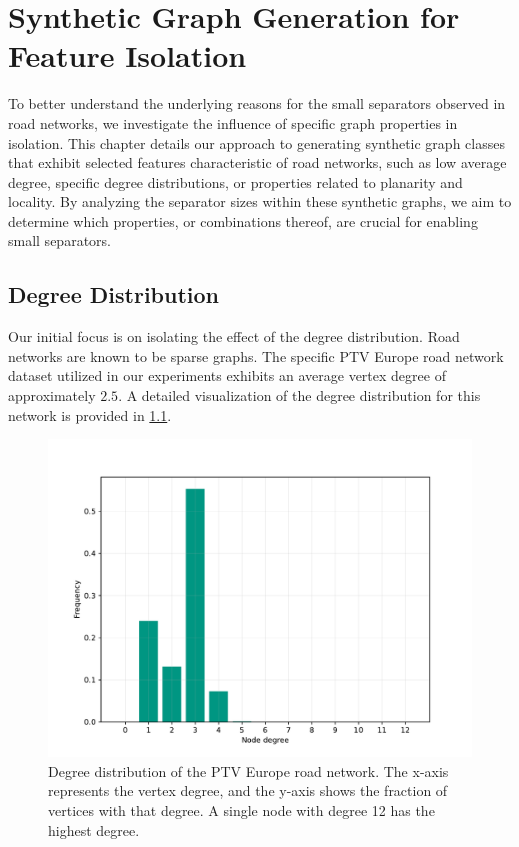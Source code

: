 \chapter{Synthetic Graph Generation for Feature Isolation}

To better understand the underlying reasons for the small separators observed in road networks, we investigate the influence of specific graph properties in isolation.
This chapter details our approach to generating synthetic graph classes that exhibit selected features characteristic of road networks, such as low average degree, specific degree distributions, or properties related to planarity and locality.
By analyzing the separator sizes within these synthetic graphs, we aim to determine which properties, or combinations thereof, are crucial for enabling small separators.

\section{Degree Distribution}

Our initial focus is on isolating the effect of the degree distribution.
Road networks are known to be sparse graphs.
The specific PTV Europe road network dataset \cite{ptv_group_dimacs-europe_2009} utilized in our experiments exhibits an average vertex degree of approximately \(2.5\).
A detailed visualization of the degree distribution for this network is provided in \cref{fig:degree_dist_europe}.

\begin{figure}[tbhp]
    \centering
    \includegraphics[width=0.6\linewidth]{graphics/degree_overview_europe.pdf}
    \caption{Degree distribution of the PTV Europe road network. The x-axis represents the vertex degree, and the y-axis shows the fraction of vertices with that degree. A single node with degree 12 has the highest degree.}
    \label{fig:degree_dist_europe}
\end{figure}

